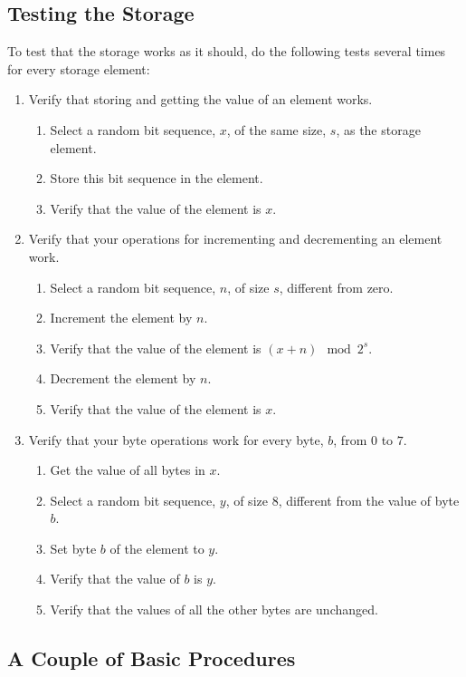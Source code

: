 \documentclass[a4paper,11pt]{article}
\begin{document}
\subsection{Testing the Storage}

To test that the storage works as it should, do the following tests several times for every storage element:
\begin{enumerate}
\item Verify that storing and getting the value of an element works.
  \begin{enumerate}
  \item Select a random bit sequence, $x$, of the same size, $s$, as the storage element.
  \item Store this bit sequence in the element.
  \item Verify that the value of the element is $x$.
  \end{enumerate}
\item Verify that your operations for incrementing and decrementing an element work.
  \begin{enumerate}
  \item Select a random bit sequence, $n$, of size $s$, different from zero.
  \item Increment the element by $n$.
  \item Verify that the value of the element is $(x + n) \mod 2^s$.
  \item Decrement the element by $n$.
  \item Verify that the value of the element is $x$.
  \end{enumerate}
\item Verify that your byte operations work for every byte, $b$, from $0$ to $7$.
  \begin{enumerate}
  \item Get the value of all bytes in $x$.
  \item Select a random bit sequence, $y$, of size $8$, different from the value of byte $b$.
  \item Set byte $b$ of the element to $y$.
  \item Verify that the value of $b$ is $y$.
  \item Verify that the values of all the other bytes are unchanged.
  \end{enumerate}
\end{enumerate}

\subsection{A Couple of Basic Procedures}
\end{document}
